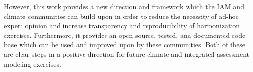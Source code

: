 However, this work provides a new direction and framework which the IAM and
climate communities can build upon in order to reduce the necessity of ad-hoc
expert opinion and increase transparency and reproducibility of harmonization
exercises. Furthermore, it provides an open-source, tested, and documented code
base which can be used and improved upon by these communities. Both of these are
clear steps in a positive direction for future climate and integrated assessment
modeling exercises.
